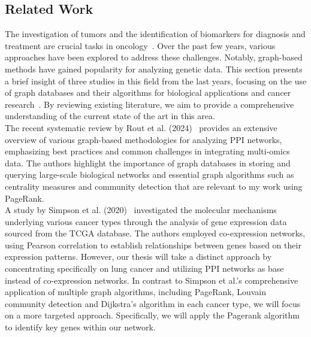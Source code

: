 \subsection{Related Work} \label{subsec:related_work}
The investigation of tumors and the identification of biomarkers for diagnosis and treatment are crucial tasks in oncology~\cite{das2024biomarkers}.
Over the past few years, various approaches have been explored to address these challenges.
Notably, graph-based methods have gained popularity for analyzing genetic data.
This section presents a brief insight of three studies in this field from the last years,
focusing on the use of graph databases and their algorithms for biological applications and
cancer research~\cite{rout2024systematic, simpson2020applying, shan2020network}.
By reviewing existing literature, we aim to provide a comprehensive understanding of the current state of the art in this area.
\\

The recent systematic review by Rout et al. (2024)~\cite{rout2024systematic} provides an extensive overview of
various graph-based methodologies for analyzing PPI networks,
emphasizing best practices and common challenges in integrating multi-omics data.
The authors highlight the importance of graph databases in storing and querying large-scale biological networks
and essential graph algorithms such as centrality measures and community detection that are relevant to my work using PageRank.
\\

A study by Simpson et al. (2020)~\cite{simpson2020applying} investigated the molecular mechanisms underlying various cancer types
through the analysis of gene expression data sourced from the TCGA database.
The authors employed co-expression networks, using Pearson correlation to establish relationships between genes based on their expression patterns.
However, our thesis will take a distinct approach by concentrating specifically on lung cancer
and utilizing PPI networks as base instead of co-expression networks.
In contrast to Simpson et al.'s comprehensive application of multiple graph algorithms, including PageRank,
Louvain community detection and Dijkstra's algorithm in each cancer type, we will focus on a more targeted approach.
Specifically, we will apply the Pagerank algorithm to identify key genes within our network.
\\

